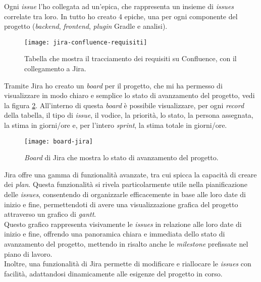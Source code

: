 Ogni \textit{issue} l'ho collegata ad un'epica, che rappresenta un insieme di \textit{issues} correlate tra loro. In tutto ho creato 4 epiche,
una per ogni componente del progetto (\textit{backend}, \textit{frontend}, \textit{plugin} Gradle e analisi).\\
\begin{figure}[!h] 
  \centering 
  \texttt{[image: jira-confluence-requisiti]} 
  \caption{Tabella che mostra il tracciamento dei requisiti su Confluence, con il collegamento a Jira.}
  \label{fig:jira-confluence-requisiti}
\end{figure}

Tramite Jira ho creato un \textit{board} per il progetto, che mi ha permesso di visualizzare in modo chiaro e 
semplice lo stato di avanzamento del progetto, vedi la figura \ref*{fig:board-jira}.
All'interno di questa \textit{board} è possibile visualizzare, per ogni \textit{record} della tabella, il tipo di \textit{issue}, il vodice, la priorità, lo stato,
la persona assegnata, la stima in giorni/ore e, per l'intero \textit{sprint}, la stima totale in giorni/ore.\\


\begin{figure}[!h] 
  \centering 
  \texttt{[image: board-jira]} 
  \caption{\textit{Board} di Jira che mostra lo stato di avanzamento del progetto.}
  \label{fig:board-jira}
\end{figure}

\noindent Jira offre una gamma di funzionalità avanzate, tra cui spicca la capacità di creare dei \textit{plan}. 
Questa funzionalità si rivela particolarmente utile nella pianificazione delle \textit{issues}, consentendo di organizzarle 
efficacemente in base alle loro date di inizio e fine, permettendoti di avere una visualizzazione grafica del 
progetto attraverso un grafico di \textit{gantt}. \\ Questo grafico rappresenta visivamente le \textit{issues} 
in relazione alle loro date di inizio e fine, offrendo una panoramica chiara e immediata dello stato di avanzamento del progetto, mettendo
in risalto anche le \textit{milestone} prefissate nel piano di lavoro.\\ 
Inoltre, una funzionalità di Jira permette di modificare e riallocare le \textit{issues} con facilità, 
adattandosi dinamicamente alle esigenze del progetto in corso.
